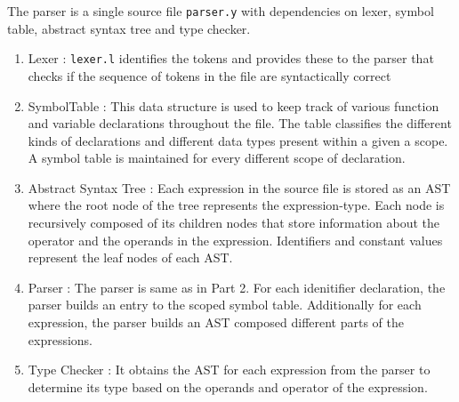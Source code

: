 \documentclass[12pt]{article}
\begin{document}
The parser is a single source file \texttt{parser.y} with dependencies on lexer, symbol table, abstract syntax tree and type checker.  
\begin{enumerate}
\item Lexer : \texttt{lexer.l} identifies the tokens and provides these to the parser that checks if the sequence of tokens in the file are syntactically correct
\item SymbolTable : This data structure is used to keep track of various function and variable declarations throughout the file. The table classifies the different kinds of declarations and different data types present within a given a scope. A symbol table is maintained for every different scope of declaration.
\item Abstract Syntax Tree :  Each expression in the source file is stored as an AST where the root node of the tree represents the expression-type. Each node is recursively composed of its children nodes that store information about the operator and the operands in the expression. Identifiers and constant values represent the leaf nodes of each AST.
\item Parser : The parser is same as in Part 2. For each idenitifier declaration, the parser builds an entry to the scoped symbol table. Additionally for each expression, the parser builds an AST composed different parts of the expressions.  
\item Type Checker : It obtains the AST for each expression from the parser to determine its type based on the operands and operator of the expression. 
\end{enumerate}
\end{document}
